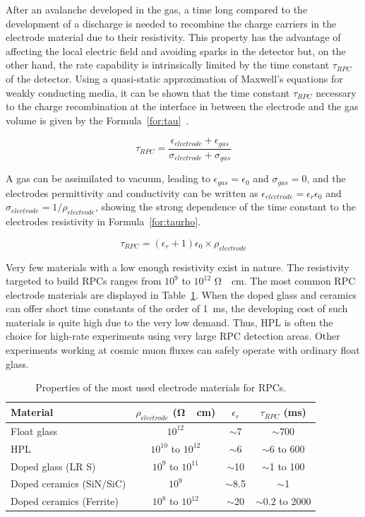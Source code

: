 	After an avalanche developed in the gas, a time long compared to the development of a discharge is needed to recombine the charge carriers in the electrode material due to their resistivity. This property has the advantage of affecting the local electric field and avoiding sparks in the detector but, on the other hand, the rate capability is intrinsically limited by the time constant $\tau_{RPC}$ of the detector. Using a quasi-static approximation of Maxwell’s equations for weakly conducting media, it can be shown that the time constant $\tau_{RPC}$ necessary to the charge recombination at the interface in between the electrode and the gas volume is given by the Formula~\ref{for:tau}~\cite{RIEGLER2002}.
	
	\begin{equation}
		\label{for:tau}
		\tau_{RPC} = \frac{\epsilon_{electrode}+\epsilon_{gas}}{\sigma_{electrode}+\sigma_{gas}}
	\end{equation}
	
	A gas can be assimilated to vacuum, leading to $\epsilon_{gas} = \epsilon_0$ and $\sigma_{gas} = 0$, and the electrodes permittivity and conductivity can be written as $\epsilon_{electrode} = \epsilon_r\epsilon_0$ and $\sigma_{electrode} = 1/\rho_{electrode}$, showing the strong dependence of the time constant to the electrodes resistivity in Formula~\ref{for:taurho}.
	
	\begin{equation}
		\label{for:taurho}
		\tau_{RPC} = (\epsilon_r + 1)\epsilon_0\times\rho_{electrode}
	\end{equation}
	
	Very few materials with a low enough resistivity exist in nature. The resistivity targeted to build RPCs ranges from $10^9$ to $10^{12}$ \si{\ohm\cdot cm}. The most common RPC electrode materials are displayed in Table~\ref{tab:tau}. When the doped glass and ceramics can offer short time constants of the order of \SI{1}{ms}, the developing cost of such materials is quite high due to the very low demand. Thus, \acf{HPL} is often the choice for high-rate experiments using very large RPC detection areas. Other experiments working at cosmic muon fluxes can safely operate with ordinary float glass.
	
	\begin{table}[H]
		\centering
		\begin{tabular}{|l|c|c|c|}
		\hline
		Material & $\rho_{electrode}$ (\si{\ohm\cdot cm}) & $\epsilon_r$ & $\tau_{RPC}$ (\si{ms})\\
		\hline
		Float glass & $10^{12}$ & $\sim$7 & $\sim$700\\
		\acl{HPL} & $10^{10}$ to $10^{12}$ & $\sim$6 & $\sim$6 to 600\\
		Doped glass (LR S) & $10^{9}$ to $10^{11}$ & $\sim$10 & $\sim$1 to 100\\
		Doped ceramics (SiN/SiC) & $10^{9}$ & $\sim$8.5 & $\sim$1\\
		Doped ceramics (Ferrite) & $10^{8}$ to $10^{12}$ & $\sim$20 & $\sim$0.2 to 2000\\
		\hline
		\end{tabular}
		\caption{\label{tab:tau} Properties of the most used electrode materials for RPCs.}
	\end{table}

